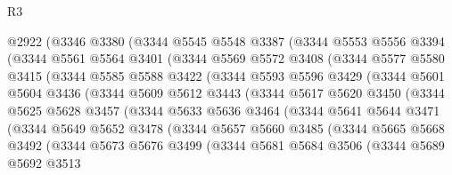 \begin{lexlean}{R3}
\begin{coremodule}
    @2922
      (@3346
        @3380
        (@3344
          @5545
          @5548
          @3387
          (@3344
            @5553
            @5556
            @3394
            (@3344
              @5561
              @5564
              @3401
              (@3344
                @5569
                @5572
                @3408
                (@3344
                  @5577
                  @5580
                  @3415
                  (@3344
                    @5585
                    @5588
                    @3422
                    (@3344
                      @5593
                      @5596
                      @3429
                      (@3344
                        @5601
                        @5604
                        @3436
                        (@3344
                          @5609
                          @5612
                          @3443
                          (@3344
                            @5617
                            @5620
                            @3450
                            (@3344
                              @5625
                              @5628
                              @3457
                              (@3344
                                @5633
                                @5636
                                @3464
                                (@3344
                                  @5641
                                  @5644
                                  @3471
                                  (@3344
                                    @5649
                                    @5652
                                    @3478
                                    (@3344
                                      @5657
                                      @5660
                                      @3485
                                      (@3344
                                        @5665
                                        @5668
                                        @3492
                                        (@3344
                                          @5673
                                          @5676
                                          @3499
                                          (@3344
                                            @5681
                                            @5684
                                            @3506
                                            (@3344
                                              @5689
                                              @5692
                                              @3513

\end{coremodule}
\end{lexlean}
